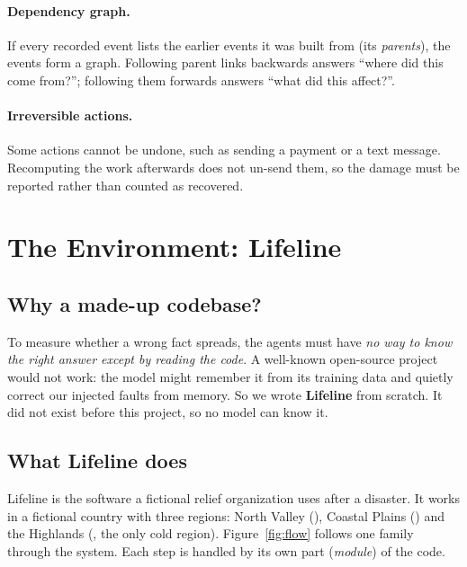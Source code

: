 \documentclass{article}
\newcommand{\code}[1]{\texttt{\detokenize{#1}}}
\begin{document}
\paragraph{Dependency graph.} If every recorded event lists the earlier events it was built from (its \emph{parents}), the events form a graph. Following parent links backwards answers ``where did this come from?''; following them forwards answers ``what did this affect?''.

\paragraph{Irreversible actions.} Some actions cannot be undone, such as sending a payment or a text message. Recomputing the work afterwards does not un-send them, so the damage must be reported rather than counted as recovered.

\section{The Environment: Lifeline}
\label{sec:lifeline}

\subsection{Why a made-up codebase?}

To measure whether a wrong fact spreads, the agents must have \emph{no way to know the right answer except by reading the code}. A well-known open-source project would not work: the model might remember it from its training data and quietly correct our injected faults from memory. So we wrote \textbf{Lifeline} from scratch. It did not exist before this project, so no model can know it.

\subsection{What Lifeline does}

Lifeline is the software a fictional relief organization uses after a disaster. It works in a fictional country with three regions: North Valley (\code{NVL}), Coastal Plains (\code{CPL}) and the Highlands (\code{HGL}, the only cold region). Figure~\ref{fig:flow} follows one family through the system. Each step is handled by its own part (\emph{module}) of the code.
\end{document}
